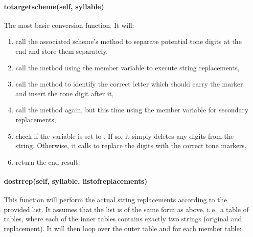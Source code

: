 \documentclass{ltxdockit}
\begin{document}
\paragraph{to\textunderscore{}target\textunderscore{}scheme(self, syllable)}

The most basic conversion function. It will:

\begin{enumerate}
  \item call the associated  scheme's
     method
    to separate potential tone digits at the end and store them separately,
  \item call the  method using
    the  member variable to execute string
    replacements,
  \item call the  method
    to identify the correct letter which should carry the marker and insert the
    tone digit after it,
  \item call the  method
    again, but this time using the
     member variable for
    secondary replacements,
  \item check if the  variable is set to
    . If so, it simply deletes any digits from the string. Otherwise,
    it calls  to replace
    the digits with the correct tone markers,
  \item return the end result.
\end{enumerate}

\paragraph{do\textunderscore{}str\textunderscore{}rep(self, syllable,
list\textunderscore{}of\textunderscore{}replacements)}

This function will perform the actual string replacements according to the
provided list. It assumes that the list is of the same form as
 above, i.\,e.\ a table of tables, where each
of the inner tables contains exactly two strings (original and replacement). It
will then loop over the outer table and for each member table:
\end{document}

